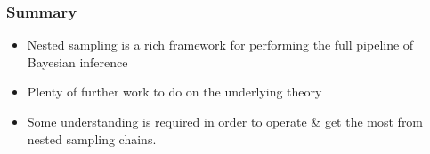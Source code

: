 \documentclass[%
]{beamer}
\begin{document}
\begin{frame}
    \frametitle{Summary}
    \begin{itemize}
        \item Nested sampling is a rich framework for performing the full pipeline of Bayesian inference
        \item Plenty of further work to do on the underlying theory
        \item Some understanding is required in order to operate \& get the most from nested sampling chains.
    \end{itemize}
\end{frame}


\end{document}
